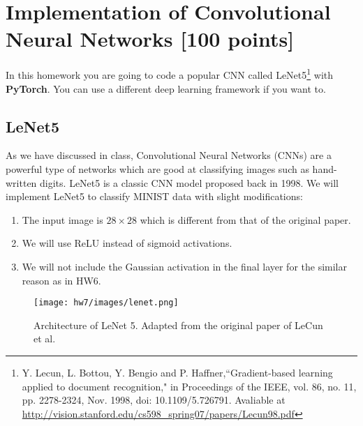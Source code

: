 \documentclass{article}
\begin{document}
\newpage

\section{Implementation of Convolutional Neural Networks [100 points]}
\label{prb:hw7::prob1}

In this homework you are going to code a popular CNN called LeNet5\footnote{Y. Lecun, L. Bottou, Y. Bengio and P. Haffner,``Gradient-based learning applied to document recognition," in Proceedings of the IEEE, vol. 86, no. 11, pp. 2278-2324, Nov. 1998, doi: 10.1109/5.726791. Avaliable at \url{http://vision.stanford.edu/cs598_spring07/papers/Lecun98.pdf}} with \textbf{PyTorch}. You can use a different deep learning framework if you want to.

\subsection{LeNet5}
As we have discussed in class, Convolutional Neural Networks (CNNs) are a powerful type of networks which are good at classifying images such as hand-written digits. LeNet5 is a classic CNN model proposed back in 1998. We will implement LeNet5 to classify MINIST data with slight modifications: 

\begin{enumerate}
    \item The input image is $28\times 28$ which is different from that of the original paper.
    \item We will use ReLU instead of sigmoid activations.
    \item We will not include the Gaussian activation in the final layer for the similar reason as in HW6.
\end{enumerate}

\begin{figure}[H]
\begin{center}
\texttt{[image: hw7/images/lenet.png]}
\end{center}
\caption{Architecture of LeNet 5. Adapted from the original paper of LeCun et al.}
\end{figure}
\end{document}
